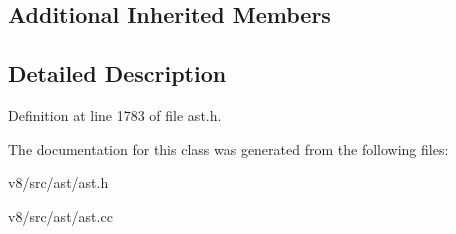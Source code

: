 \subsection*{Additional Inherited Members}


\subsection{Detailed Description}


Definition at line 1783 of file ast.\+h.



The documentation for this class was generated from the following files\+:\begin{DoxyCompactItemize}
\item 
v8/src/ast/ast.\+h\item 
v8/src/ast/ast.\+cc\end{DoxyCompactItemize}
